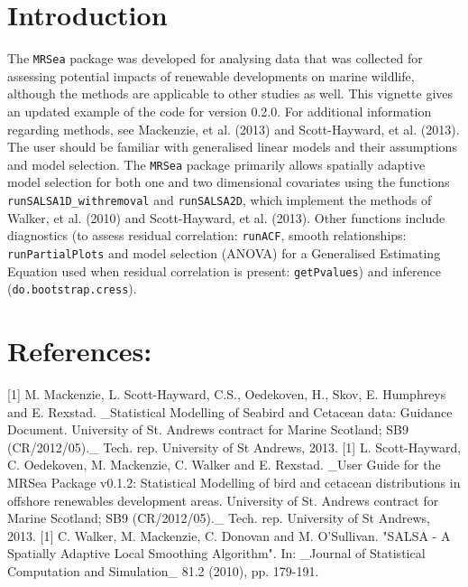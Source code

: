 \documentclass[10pt, a4paper]{article}\usepackage[]{graphicx}\usepackage[]{color}
\makeatletter
\newenvironment{kframe}{%
 \def\at@end@of@kframe{}%
 \ifinner\ifhmode%
  \def\at@end@of@kframe{\end{minipage}}%
  \begin{minipage}{\columnwidth}%
 \fi\fi%
 \def\FrameCommand##1{\hskip\@totalleftmargin \hskip-\fboxsep
 \colorbox{shadecolor}{##1}\hskip-\fboxsep
     \hskip-\linewidth \hskip-\@totalleftmargin \hskip\columnwidth}%
 \MakeFramed {\advance\hsize-\width
   \@totalleftmargin\z@ \linewidth\hsize
   \@setminipage}}%
 {\par\unskip\endMakeFramed%
 \at@end@of@kframe}
\makeatother
\begin{document}
\section{Introduction}
The {\tt MRSea} package was developed for analysing data that was collected for assessing potential impacts of renewable developments on marine wildlife, although the methods are applicable to other studies as well. This vignette gives an updated example of the code for version 0.2.0.  For additional information regarding methods, see Mackenzie, et al. (2013) and Scott-Hayward, et al. (2013).  The user should be familiar with generalised linear models and their assumptions and model selection. The {\tt MRSea} package primarily allows spatially adaptive model selection for both one and two dimensional covariates using the functions {\tt runSALSA1D\_withremoval} and {\tt runSALSA2D}, which implement the methods of Walker, et al. (2010) and Scott-Hayward, et al. (2013). Other functions include diagnostics (to assess residual correlation: {\tt runACF}, smooth relationships: {\tt runPartialPlots} and model selection (ANOVA) for a Generalised Estimating Equation used when residual correlation is present: {\tt getPvalues}) and inference ({\tt do.bootstrap.cress}). 


\section{References:}
[1] M. Mackenzie, L. Scott-Hayward, C.S., Oedekoven,
H., Skov, E. Humphreys and E. Rexstad. _Statistical
Modelling of Seabird and Cetacean data: Guidance
Document. University of St. Andrews contract for
Marine Scotland; SB9 (CR/2012/05)._ Tech. rep.
University of St Andrews, 2013.
[1] L. Scott-Hayward, C. Oedekoven, M. Mackenzie, C.
Walker and E. Rexstad. _User Guide for the MRSea
Package v0.1.2: Statistical Modelling of bird and
cetacean distributions in offshore renewables
development areas. University of St. Andrews contract
for Marine Scotland; SB9 (CR/2012/05)._ Tech. rep.
University of St Andrews, 2013.
[1] C. Walker, M. Mackenzie, C. Donovan and M.
O'Sullivan. "SALSA - A Spatially Adaptive Local
Smoothing Algorithm". In: _Journal of Statistical
Computation and Simulation_ 81.2 (2010), pp. 179-191.
\begin{kframe}

{\ttfamily\noindent\bfseries\color{errorcolor}{\#\# Error: argument 1 (type 'list') cannot be handled by 'cat'}}\end{kframe}
\end{document}
